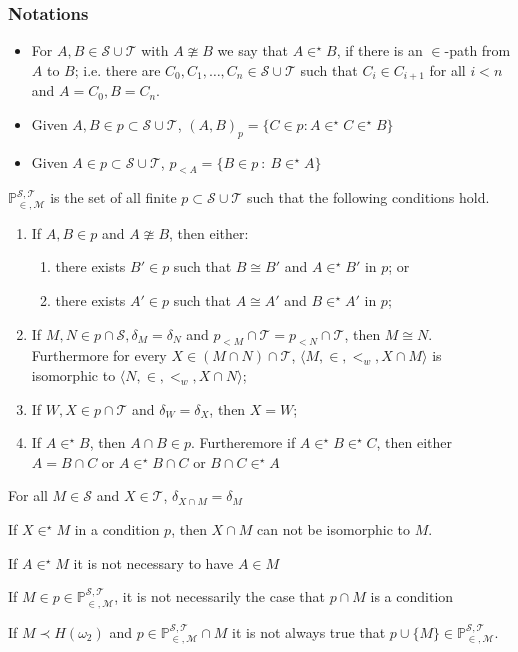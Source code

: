 \documentclass[10pt]{beamer}
\newcommand{\fn}{\mathbb{P}_{\in, \mathcal{M}}^{\mathcal{S}, \mathcal{T}}}
\newcommand{\ms}{\mathcal{S}}
\newcommand{\mt}{\mathcal{T}}
\newcommand{\e}{\in^{\star}}
\begin{document}
\begin{frame}
\frametitle{Notations}
\begin{itemize}
\item For $A, B \in \ms \cup \mt$ with $A \ncong B$ we say that $A \e B$, if there is an $\in$-path from $A$ to $B$; i.e. there are $C_0, C_1, \dots, C_n \in \ms \cup \mt$ such that $C_i \in C_{i+1}$ for all $i<n$ and $A=C_0, B=C_n$. 
\item Given $A, B \in p \subset \ms \cup \mt$, $(A,B)_p= \{C \in p: A \e C \e B\}$
\item Given $A \in p \subset \ms \cup \mt$, $p_{<A}= \{ B \in p \ : \ B \e A\}$
\end{itemize}
\end{frame}
\begin{frame}
$\fn$ is the set of all finite $p \subset \ms \cup \mt$ such that the following conditions hold.
\begin{enumerate}
\item [$(P1)$]
If $A, B \in p$ and $A \ncong B$, then either:
\begin{enumerate}
\item[$(i)$] there exists $B' \in p$ such that $B\cong B'$ and $A \e B'$ in $p$; or
\item[$(ii)$] there exists $A' \in p$ such that $A\cong A'$ and $B \e A'$ in $p$;
\end{enumerate}
\item [$(P2)$]
If  $M, N \in p \cap \ms, \delta_M = \delta_N$ and $p_{<M} \cap \mt = p_{<N} \cap \mt$, then $M \cong N$. Furthermore for every $X \in (M \cap N) \cap \mt$, $\langle M, \in, <_w, X\cap M \rangle$ is isomorphic to $\langle N, \in, <_w, X\cap N \rangle$;
\item [$(P3)$]
If $W, X \in p \cap \mt$ and $\delta_W = \delta_X$, then $X=W$;
\item [$(P4)$]
If $A \e B$, then $A \cap B \in p$. Furtheremore if $A \e B \e C$, then either $A=B \cap C$ or $A \e B\cap C$ or $B \cap C \e A$
\end{enumerate}
\end{frame}
\begin{frame}
\begin{lemma}
For all $M \in \ms$ and $X \in \mt$, $\delta_{X \cap M}= \delta_M$

If $X \e M$ in a condition $p$, then $X \cap M$ can not be isomorphic to $M$.
\end{lemma}
\begin{fact}
If $A \e M$ it is not necessary to have $A \in M$

If $M \in p \in \fn$, it is not necessarily the case that $p \cap M$ is a condition

If $M \prec H(\omega_2)$ and $p \in \fn \cap M$ it is not always true that $p \cup \{M\} \in \fn$.
\end{fact}
\end{frame}
\end{document}
